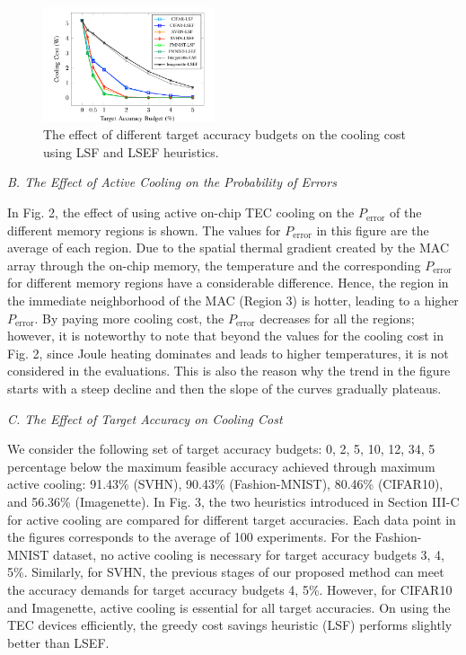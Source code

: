 \documentclass[sigconf]{acmart}
\begin{document}
\begin{figure}
    \centering
    \includegraphics[width=0.45\textwidth]{Figures/Picture3.png} 
    \caption{The effect of different target accuracy budgets on the
 cooling cost using LSF and LSEF heuristics.}
    \label{Theeffect ofdifferent target accuracybudgetson the
 coolingcostusingLSFandLSEFheuristics.}
\end{figure}

\vspace{3em}
\noindent \textit{B. The Effect of Active Cooling on the Probability of Errors}

In Fig. 2, the effect of using active on-chip TEC cooling on the \( P_{\text{error}} \) of the different memory regions is shown. The values for \( P_{\text{error}} \) in this figure are the average of each region. Due to the spatial thermal gradient created by the MAC array through the on-chip memory, the temperature and the corresponding \( P_{\text{error}} \) for different memory regions have a considerable difference. Hence, the region in the immediate neighborhood of the MAC (Region 3) is hotter, leading to a higher \( P_{\text{error}} \). By paying more cooling cost, the \( P_{\text{error}} \) decreases for all the regions; however, it is noteworthy to note that beyond the values for the cooling cost in Fig. 2, since Joule heating dominates and leads to higher temperatures, it is not considered in the evaluations. This is also the reason why the trend in the figure starts with a steep decline and then the slope of the curves gradually plateaus.

\noindent \textit{C. The Effect of Target Accuracy on Cooling Cost}

We consider the following set of target accuracy budgets: 0, 2, 5, 10, 12, 34, 5 percentage below the maximum feasible accuracy achieved through maximum active cooling: 91.43\% (SVHN), 90.43\% (Fashion-MNIST), 80.46\% (CIFAR10), and 56.36\% (Imagenette). In Fig. 3, the two heuristics introduced in Section III-C for active cooling are compared for different target accuracies. Each data point in the figures corresponds to the average of 100 experiments. For the Fashion-MNIST dataset, no active cooling is necessary for target accuracy budgets 3, 4, 5\%. Similarly, for SVHN, the previous stages of our proposed method can meet the accuracy demands for target accuracy budgets 4, 5\%. However, for CIFAR10 and Imagenette, active cooling is essential for all target accuracies. On using the TEC devices efficiently, the greedy cost savings heuristic (LSF) performs slightly better than LSEF.
\end{document}
